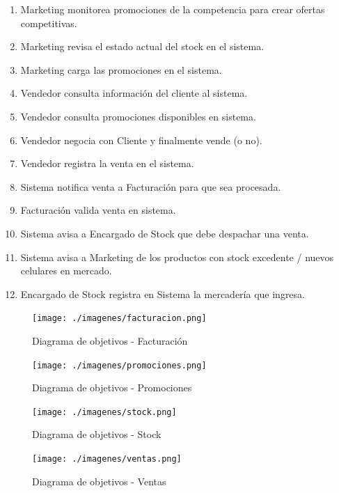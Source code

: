 \begin{enumerate}

	\item Marketing monitorea promociones de la competencia para crear ofertas competitivas.
	 
	\item Marketing revisa el estado actual del stock en el sistema.
	 
	\item Marketing carga las promociones en el sistema.
	 
	\item Vendedor consulta información del cliente al sistema.
	 
	\item Vendedor consulta promociones disponibles en sistema.
	 
	\item Vendedor negocia con Cliente y finalmente vende (o no).
	 
	\item Vendedor registra la venta en el sistema.
	 
	\item Sistema notifica venta a Facturación para que sea procesada.
	 
	\item Facturación valida venta en sistema.
	 
	\item Sistema avisa a Encargado de Stock que debe despachar una venta.

	\item Sistema avisa a Marketing de los productos con stock excedente / nuevos celulares en mercado.

	\item Encargado de Stock registra en Sistema la mercadería que ingresa.

\end{enumerate}


\clearpage

\begin{figure}[h!]
  	\centering
	\texttt{[image: ./imagenes/facturacion.png]}
	\caption{Diagrama de objetivos - Facturación}
\end{figure}

\clearpage

\begin{figure}[h!]
  	\centering
	\texttt{[image: ./imagenes/promociones.png]}
	\caption{Diagrama de objetivos - Promociones}
\end{figure}

\clearpage

\begin{figure}[h!]
  	\centering
	\texttt{[image: ./imagenes/stock.png]}
	\caption{Diagrama de objetivos - Stock}
\end{figure}

\clearpage

\begin{figure}[h!]
  	\centering
	\texttt{[image: ./imagenes/ventas.png]}
	\caption{Diagrama de objetivos - Ventas}
\end{figure}